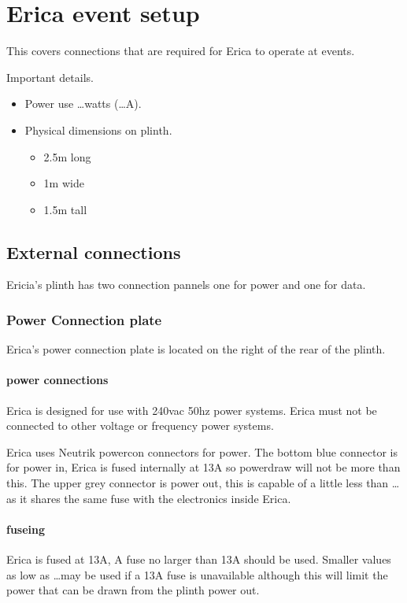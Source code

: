 \chapter{Erica event setup}

This covers connections that are required for Erica to operate at events.

Important details.
\begin{itemize}
	\item Power use \dots watts (\dots A).
	\item Physical dimensions on plinth.
	\begin{itemize}
		\item 2.5m long
		\item 1m wide
		\item 1.5m tall
	\end{itemize}
\end{itemize}


\section{External connections}

Ericia's plinth has two connection pannels one for power and one for data.

\subsection{Power Connection plate}

Erica's power connection plate is located on the right of the rear of the plinth.

\subsubsection{power connections}
Erica is designed for use with 240vac 50hz power systems. Erica must not be connected to other voltage or frequency power systems. 

Erica uses Neutrik powercon connectors for power.
The bottom blue connector is for power in, Erica is fused internally at 13A so powerdraw will not be more than this.
The upper grey connector is power out, this is capable of a little less than \dots as it shares the same fuse with the electronics inside Erica.

\subsubsection{fuseing}
Erica is fused at 13A, A fuse no larger than 13A should be used. Smaller values as low as \dots may be used if a 13A fuse is unavailable although this will limit the power that can be drawn from the plinth power out.

